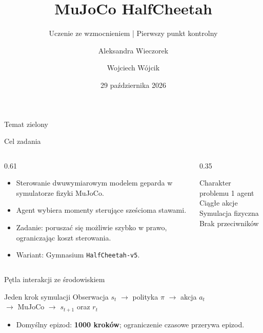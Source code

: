 \documentclass[aspectratio=169,11pt]{beamer}
\title{MuJoCo HalfCheetah}
\subtitle{Uczenie ze wzmocnieniem \quad | \quad Pierwszy punkt kontrolny}
\author{Aleksandra Wieczorek \and Wojciech W\'ojcik  }
\institute{Politechnika Warszawska}
\date{29 pa\'zdziernika 2026}
\begin{document}
\begin{frame}
  \titlepage
  \vspace{-0.5em}
  \begin{center}\small Temat zielony\end{center}
\end{frame}

\begin{frame}{Cel zadania}
  \begin{columns}[T,onlytextwidth]
    \begin{column}{0.61\textwidth}
      \begin{itemize}
        \item Sterowanie dwuwymiarowym modelem geparda w symulatorze fizyki MuJoCo.
        \item Agent wybiera momenty steruj\k{a}ce sze\'scioma stawami.
        \item Zadanie: porusza\'c si\k{e} mo\.zliwie szybko w prawo, ograniczaj\k{a}c koszt sterowania.
        \item Wariant: Gymnasium \texttt{HalfCheetah-v5}.
      \end{itemize}
    \end{column}
    \begin{column}{0.35\textwidth}
      \begin{block}{Charakter problemu}
        1 agent\\[0.3em]
        Ci\k{a}g\l e akcje\\[0.3em]
        Symulacja fizyczna\\[0.3em]
        Brak przeciwnik\'ow
      \end{block}
    \end{column}
  \end{columns}
\end{frame}

\begin{frame}{P\k{e}tla interakcji ze \'srodowiskiem}
  \centering
  \begin{block}{Jeden krok symulacji}
    \centering
    Obserwacja $s_t$ $\longrightarrow$ polityka $\pi$ $\longrightarrow$ akcja $a_t$\\[0.6em]
    \centering $\longrightarrow$ MuJoCo $\longrightarrow$ $s_{t+1}$ oraz $r_t$
  \end{block}
  \vspace{1em}
  \begin{itemize}
    \item Domy\'slny epizod: \textbf{1000 krok\'ow}; ograniczenie czasowe przerywa epizod.
  \end{itemize}
\end{frame}
\end{document}
